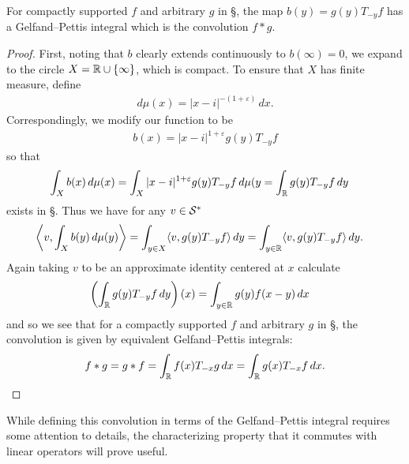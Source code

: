     \begin{claim}
      \label{claim:GPconv}
      For compactly supported $f$ and arbitrary $g$ in \S, the map $b(y)=g(y)T_{-y}f$ has a Gelfand--Pettis integral which is the convolution $f*g$.
    \end{claim}
    \begin{proof}
      First, noting that $b$ clearly extends continuously to $b(\infty)=0$, we expand \R to the circle $X=\mathbb{R}\cup\{\infty\}$, which is compact.
      To ensure that $X$ has finite measure, define
      \begin{align*}
        d\mu(x) = |x-i|^{-(1+\varepsilon)}\,dx \text{.}
      \end{align*}
      Correspondingly, we modify our function to be
      \begin{align*}
        b(x) = |x-i|^{1+\varepsilon} g(y)T_{-y}f
      \end{align*}
      so that
      \begin{align*}
        \int_X b(x)\,d\mu(x)
        &= \int_{X} |x-i|^{1+\varepsilon} g(y)T_{-y}f\,d\mu(y
        = \int_{\mathbb{R}} g(y)T_{-y}f\,dy
      \end{align*}
      exists in \S.
      Thus we have for any $v\in\mathcal{S}^*$
      \begin{align*}
        \left\langle v, \int_X b(y)\,d\mu(y) \right\rangle
        &= \int_{y\in X} \langle v, g(y)T_{-y}f\rangle\, dy
        = \int_{y\in\mathbb{R}} \langle v, g(y)T_{-y}f\rangle\, dy \text{.}
      \end{align*}
      Again taking $v$ to be an approximate identity centered at $x$ calculate
      \begin{align*}
        \left( \int_{\mathbb{R}} g(y)T_{-y}f\,dy \right)(x)
        &= \int_{y\in\mathbb{R}} g(y)f(x-y)\,dx
      \end{align*}
      and so we see that for a compactly supported $f$ and arbitrary $g$ in \S, the convolution is given by equivalent Gelfand--Pettis integrals:
      \begin{align*}
        f*g = g*f = \int_\mathbb{R} f(x)T_{-x}g\,dx = \int_\mathbb{R} g(x)T_{-x}f\,dx \text{.}
      \end{align*}
    \end{proof}
    While defining this convolution in terms of the Gelfand--Pettis integral requires some attention to details, the characterizing property that it commutes with linear operators will prove useful.

